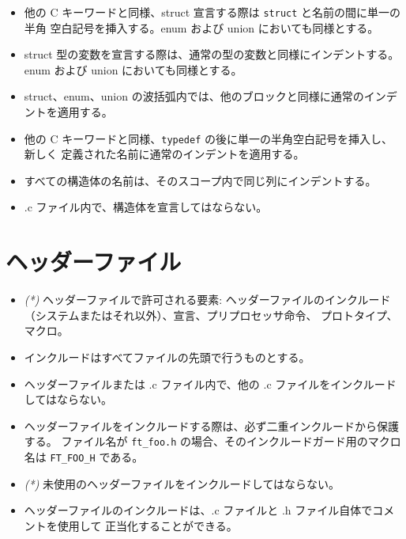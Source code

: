 \documentclass{42-ja}
\begin{document}
\begin{itemize}

\item 他の C キーワードと同様、struct 宣言する際は \texttt{struct} と名前の間に単一の半角
  空白記号を挿入する。enum および union においても同様とする。

\item struct 型の変数を宣言する際は、通常の型の変数と同様にインデントする。enum および union
  においても同様とする。

\item struct、enum、union の波括弧内では、他のブロックと同様に通常のインデントを適用する。

\item 他の C キーワードと同様、\texttt{typedef} の後に単一の半角空白記号を挿入し、新しく
  定義された名前に通常のインデントを適用する。

\item すべての構造体の名前は、そのスコープ内で同じ列にインデントする。

\item .c ファイル内で、構造体を宣言してはならない。

\end{itemize}
\newpage



\section{ヘッダーファイル}

\begin{itemize}

    \item \textit{(*)} ヘッダーファイルで許可される要素:
        ヘッダーファイルのインクルード（システムまたはそれ以外）、宣言、プリプロセッサ命令、
        プロトタイプ、マクロ。

    \item インクルードはすべてファイルの先頭で行うものとする。

    \item ヘッダーファイルまたは .c ファイル内で、他の .c ファイルをインクルードしてはならない。

    \item ヘッダーファイルをインクルードする際は、必ず二重インクルードから保護する。
      ファイル名が \texttt{ft\_foo.h} の場合、そのインクルードガード用のマクロ名は 
      \texttt{FT\_FOO\_H} である。

    \item \textit{(*)} 未使用のヘッダーファイルをインクルードしてはならない。

    \item ヘッダーファイルのインクルードは、.c ファイルと .h ファイル自体でコメントを使用して
      正当化することができる。

\end{itemize}
\end{document}
